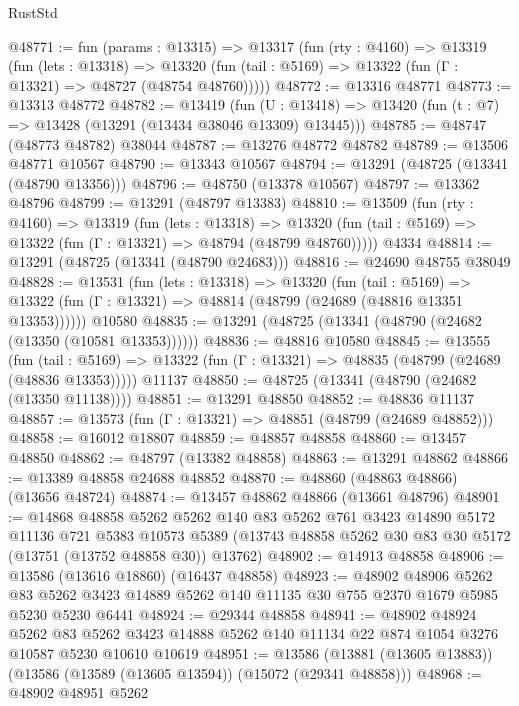 \begin{lexlean}{RustStd}
\begin{coremodule}
@48771 := fun (params : @13315) =>
  @13317
    (fun (rty : @4160) =>
    @13319
      (fun (lets : @13318) =>
      @13320 (fun (tail : @5169) => @13322 (fun (Γ : @13321) => @48727 (@48754 @48760)))))
@48772 := @13316 @48771
@48773 := @13313 @48772
@48782 := @13419
    (fun (U : @13418) => @13420 (fun (t : @7) => @13428 (@13291 (@13434 @38046 @13309) @13445)))
@48785 := @48747 (@48773 @48782) @38044
@48787 := @13276 @48772 @48782
@48789 := @13506 @48771 @10567
@48790 := @13343 @10567
@48794 := @13291 (@48725 (@13341 (@48790 @13356)))
@48796 := @48750 (@13378 @10567)
@48797 := @13362 @48796
@48799 := @13291 (@48797 @13383)
@48810 := @13509
    (fun (rty : @4160) =>
    @13319
      (fun (lets : @13318) =>
      @13320 (fun (tail : @5169) => @13322 (fun (Γ : @13321) => @48794 (@48799 @48760)))))
    @4334
@48814 := @13291 (@48725 (@13341 (@48790 @24683)))
@48816 := @24690 @48755 @38049
@48828 := @13531
    (fun (lets : @13318) =>
    @13320
      (fun (tail : @5169) =>
      @13322 (fun (Γ : @13321) => @48814 (@48799 (@24689 (@48816 @13351 @13353))))))
    @10580
@48835 := @13291 (@48725 (@13341 (@48790 (@24682 (@13350 (@10581 @13353))))))
@48836 := @48816 @10580
@48845 := @13555
    (fun (tail : @5169) => @13322 (fun (Γ : @13321) => @48835 (@48799 (@24689 (@48836 @13353)))))
    @11137
@48850 := @48725 (@13341 (@48790 (@24682 (@13350 @11138))))
@48851 := @13291 @48850
@48852 := @48836 @11137
@48857 := @13573 (fun (Γ : @13321) => @48851 (@48799 (@24689 @48852)))
@48858 := @16012 @18807
@48859 := @48857 @48858
@48860 := @13457 @48850
@48862 := @48797 (@13382 @48858)
@48863 := @13291 @48862
@48866 := @13389 @48858 @24688 @48852
@48870 := @48860 (@48863 @48866) (@13656 @48724)
@48874 := @13457 @48862 @48866 (@13661 @48796)
@48901 := @14868
    @48858
    @5262
    @5262
    @140
    @83
    @5262
    @761
    @3423
    @14890
    @5172
    @11136
    @721
    @5383
    @10573
    @5389
    (@13743 @48858 @5262 @30 @83 @30 @5172 (@13751 (@13752 @48858 @30)) @13762)
@48902 := @14913 @48858
@48906 := @13586 (@13616 @18860) (@16437 @48858)
@48923 := @48902
    @48906
    @5262
    @83
    @5262
    @3423
    @14889
    @5262
    @140
    @11135
    @30
    @755
    @2370
    @1679
    @5985
    @5230
    @5230
    @6441
@48924 := @29344 @48858
@48941 := @48902
    @48924
    @5262
    @83
    @5262
    @3423
    @14888
    @5262
    @140
    @11134
    @22
    @874
    @1054
    @3276
    @10587
    @5230
    @10610
    @10619
@48951 := @13586 (@13881 (@13605 @13883)) (@13586 (@13589 (@13605 @13594)) (@15072 (@29341 @48858)))
@48968 := @48902
    @48951
    @5262

\end{coremodule}
\end{lexlean}
